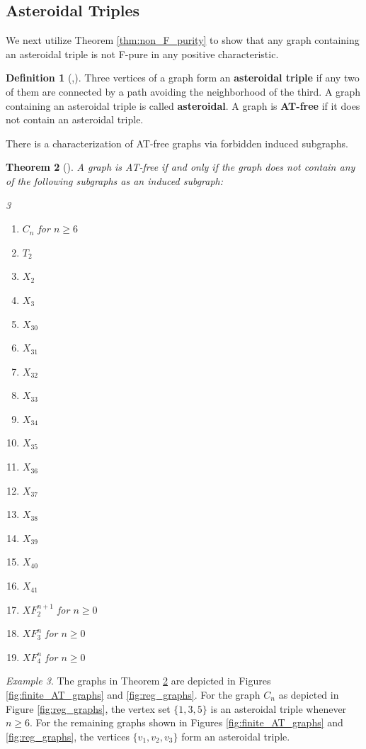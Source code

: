\documentclass[12pt,a4paper]{amsart}
\theoremstyle{plain}
\newtheorem{thrm}{Theorem}[section]
\def\bthm{\begin{thrm}}
\def\ethm{\end{thrm}}
\theoremstyle{definition}
\newtheorem{defn}[thrm]{Definition}
\def\bdefn{\begin{defn}}
\def\edefn{\end{defn}}
\theoremstyle{remark}
\newtheorem{ex}[thrm]{Example}
\def\bex{\begin{ex}}
\def\eex{\end{ex}}
\begin{document}
\subsection{Asteroidal Triples}

We next utilize Theorem \ref{thm:non_F_purity} to show that any graph containing an asteroidal triple is not F-pure in any positive characteristic.

\bdefn[\cite{isgciATFree},\cite{LB62}]
Three vertices of a graph form an \textbf{asteroidal triple} if any two of them are connected by a path avoiding the neighborhood of the third. A graph containing an asteroidal triple is called \textbf{asteroidal}.  A graph is \textbf{AT-free} if it does not contain an asteroidal triple.
\edefn 

There is a characterization of AT-free graphs via forbidden induced subgraphs.

\bthm[\cite{isgciATFree}]
\label{thm:forbidden_subgraph_AT_free}
A graph is AT-free if and only if the graph does not contain any of the following subgraphs as an induced subgraph:
\begin{multicols}{3}
\begin{enumerate}
\item $C_{n}$ for $n \geq 6$
\item $T_{2}$
\item $X_{2}$
\item $X_{3}$
\item $X_{30}$
\item $X_{31}$
\item $X_{32}$
\item $X_{33}$
\item $X_{34}$
\item $X_{35}$
\item $X_{36}$
\item $X_{37}$
\item $X_{38}$
\item $X_{39}$
\item $X_{40}$
\item $X_{41}$
\item $XF_{2}^{n+1}$ for $n \geq 0$
\item $XF_{3}^{n}$ for $n \geq 0$
\item $XF_{4}^{n}$ for $n \geq 0$
\end{enumerate}
\end{multicols}
\ethm

\bex 
The graphs in Theorem \ref{thm:forbidden_subgraph_AT_free} are depicted in Figures \ref{fig:finite_AT_graphs} and \ref{fig:reg_graphs}. 
For the graph $C_{n}$ as depicted in Figure \ref{fig:reg_graphs}, the vertex set $\{1,3,5\}$ is an asteroidal triple whenever $n \geq 6$. For the remaining graphs shown in Figures \ref{fig:finite_AT_graphs} and \ref{fig:reg_graphs}, the vertices $\{v_1,v_2,v_3\}$ form an asteroidal triple.
\eex 
\end{document}
